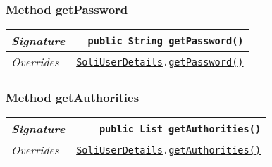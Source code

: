 \begin{adjustwidth}{1.5em}{0pt}
\begin{adjustwidth}{1.5em}{0pt}
\begin{adjustwidth}{1.5em}{0pt}
{\begin{tabularx}{1.0\linewidth}{@{}l R@{}}
      \end{tabularx}}
    \end{adjustwidth}\subsubsection{Method getPassword\label{edu.kit.hci.soli.config.security.SoliAdminUserDetails@getPassword()}}
    \begin{adjustwidth}{1.5em}{0pt}
      {\begin{tabularx}{1.0\linewidth}{@{}l R@{}}
        \emph{Signature} & \texttt{public \texttt{String} getPassword()} \\
        \hline
        \emph{Overrides} & \texttt{\texttt{\hyperref[edu.kit.hci.soli.config.security.SoliUserDetails]{\texttt{SoliUserDetails}}}.\hyperref[edu.kit.hci.soli.config.security.SoliUserDetails@getPassword()]{getPassword}\hyperref[edu.kit.hci.soli.config.security.SoliUserDetails@getPassword()]{(}\hyperref[edu.kit.hci.soli.config.security.SoliUserDetails@getPassword()]{)}} \\
        \hline
  
      \end{tabularx}}
    \end{adjustwidth}\subsubsection{Method getAuthorities\label{edu.kit.hci.soli.config.security.SoliAdminUserDetails@getAuthorities()}}
    \begin{adjustwidth}{1.5em}{0pt}
      {\begin{tabularx}{1.0\linewidth}{@{}l R@{}}
        \emph{Signature} & \texttt{public \texttt{List} getAuthorities()} \\
        \hline
        \emph{Overrides} & \texttt{\texttt{\hyperref[edu.kit.hci.soli.config.security.SoliUserDetails]{\texttt{SoliUserDetails}}}.\hyperref[edu.kit.hci.soli.config.security.SoliUserDetails@getAuthorities()]{getAuthorities}\hyperref[edu.kit.hci.soli.config.security.SoliUserDetails@getAuthorities()]{(}\hyperref[edu.kit.hci.soli.config.security.SoliUserDetails@getAuthorities()]{)}} \\
        \hline
  

\end{tabularx}}
\end{adjustwidth}
\end{adjustwidth}
\end{adjustwidth}
